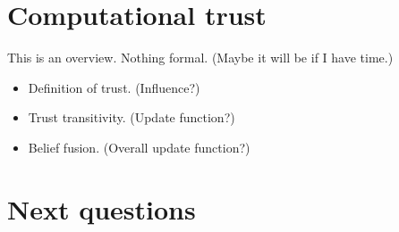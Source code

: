 \documentclass[a4paper,12pt]{article}
\theoremstyle{definition}
\numberwithin{equation}{section}
\newcommand{\red}{\textcolor{red}{red}}
\newcommand{\green}{\textcolor{green(html/cssgreen)}{green}}
\newcommand{\blue}{\textcolor{blue}{blue}}
\begin{document}







%	
%		
%		
%		
%	
%	
%	
%	

\section{Computational trust}

This is an overview. Nothing formal. (Maybe it will be if I have time.)

\begin{itemize}
	\item Definition of trust. (Influence?)
	
	\item Trust transitivity. (Update function?)
	
	\item Belief fusion. (Overall update function?)
\end{itemize}

\section{Next questions}
\end{document}
